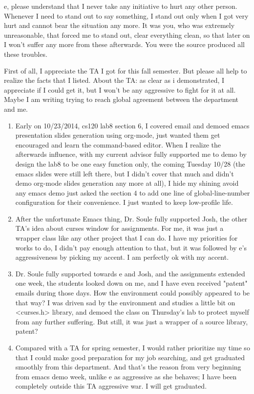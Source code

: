 \documentclass[9pt,b5paper]{article}
\begin{document}
e, please understand that I never take any initiative to hurt any other person. Whenever I need to stand out to say something, I stand out only when I got very hurt and cannot bear the situation any more. It was you, who was extremely unreasonable, that forced me to stand out, clear everything clean, so that later on I won't suffer any more from these afterwards. You were the source produced all these troubles. 


First of all, I appreciate the TA I got for this fall semester. But please all help to realize the facts that I listed. About the TA: as clear as i demonstrated, I appreciate if I could get it, but I won't be any aggressive to fight for it at all. Maybe I am writing trying to reach global agreement between the department and me. 

\begin{enumerate}
\item Early on 10/23/2014, cs120 lab8 section 6, I covered email and demoed emacs presentation slides generation using org-mode, just wanted them get encouraged and learn the command-based editor. When I realize the afterwards influence, with my current advisor fully supported me to demo by design the lab8 to be one easy function only, the coming Tuesday 10/28 (the emacs slides were still left there, but I didn't cover that much and didn't demo org-mode slides generation any more at all), I hide my shining avoid any emacs demo just asked the section 4 to add one line of global-line-number configuration for their convenience. I just wanted to keep low-profile life.
\item After the unfortunate Emacs thing, Dr. Soule fully supported Josh, the other TA's idea about curses window for assignments. For me, it was just a wrapper class like any other project that I can do. I have my priorities for works to do, I didn't pay enough attention to that, but it was followed by e's aggressiveness by picking my accent. I am perfectly ok with my accent.
\item Dr. Soule fully supported towards e and Josh, and the assignments extended one week, the students looked down on me, and I have even received "patent" emails during those days. How the environment could possibly appeared to be that way? I was driven sad by the environment and studies a little bit on <curses.h> library, and demoed the class on Thursday's lab to protect myself from any further suffering. But still, it was just a wrapper of a source library, patent?
\item Compared with a TA for spring semester, I would rather prioritize my time so that I could make good preparation for my job searching, and get graduated smoothly from this department. And that's the reason from very beginning from emacs demo week, unlike e as aggressive as she behaves; I have been completely outside this TA aggressive war. I will get graduated.
\end{enumerate}
\end{document}
